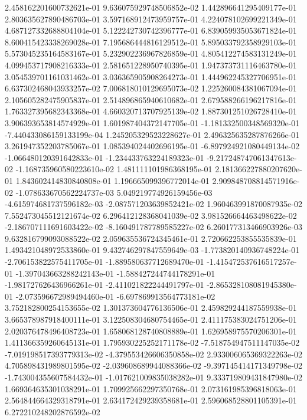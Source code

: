 2.458162201600732621e-01
9.636075929748506852e-02
1.442896641295409177e-01
2.803635627890486703e-01
3.597168912473959757e-01
4.224078102699221349e-01
4.687127332688804104e-01
5.122242730742396777e-01
6.839059935053671824e-01
8.600415423338269028e-01
7.195686444816129512e-01
5.895033792358929103e-01
5.573045235164583167e-01
5.232902236967826859e-01
4.805412274583131249e-01
4.099453717908216333e-01
2.581651228950740395e-01
1.947373731116463780e-01
3.054539701161031462e-01
3.036365905908264273e-01
1.444962245327706951e-01
6.637302468043933257e-02
7.006818010129695073e-02
1.225260084381067094e-01
2.105605282475905837e-01
2.514896865940610682e-01
2.679588266196217816e-01
1.763327395682343368e-01
4.660320713707925139e-02
1.887301251026728410e-01
3.906393653814574929e-01
1.601987404372147705e-01
-1.181332500348569320e-01
-7.440433086159133199e-04
1.245205329523228627e-01
2.496325635287876266e-01
3.261947352203785067e-01
1.085394024402696195e-01
-6.897924921080449134e-02
-1.066480120391642833e-01
-1.234433763224189323e-01
-9.217248747061347613e-02
-1.168735960580223610e-02
1.481111101986368195e-01
2.181366227880207620e-01
1.843602414830840808e-01
1.196665099396772014e-01
2.909848708814571916e-02
-1.078633670562224737e-03
5.049219774926159456e-03
-4.615974681737596182e-03
-2.087571203639852421e-02
1.960463991870087935e-02
7.552473045512121674e-02
6.296412128368041039e-02
3.981526664463498622e-02
-2.186707111691603422e-02
-8.160491787789585227e-02
6.260177313466903926e-03
9.632816799093088522e-02
2.059635536724345461e-01
2.720662253855535839e-01
1.493421048972533860e-01
9.432746297847559649e-03
-1.773820140936748224e-01
-2.706153822575411705e-01
-1.889580637712689470e-01
-1.415472537616517257e-01
-1.397043663288242143e-01
-1.588427244744178291e-01
-1.981727626436966261e-01
-2.411021822244491797e-01
-2.865328108081945380e-01
-2.073596672989494460e-01
-6.697869913564773181e-02
3.752182800254153655e-02
1.301373604776136506e-01
2.459829244187559938e-01
3.665378987918400111e-01
3.122508304680754465e-01
2.411175383024751206e-01
2.020376478496408723e-01
1.658068128740808889e-01
1.626958975570206301e-01
1.411366359260645131e-01
1.795930225252171178e-02
-7.518754947511147035e-02
-7.019198517393779313e-02
-4.379553426606350858e-02
2.933006065369322263e-02
4.705898431989801595e-02
-2.039608689944088366e-02
-9.397145414171349798e-02
-1.743004355607584432e-01
-1.017621009835038282e-01
9.333719809431847980e-02
1.669364635301038291e-01
1.709925662297350768e-01
2.073161985396818063e-01
2.564844664329318791e-01
2.634172429239358681e-01
2.596068528801105391e-01
6.272210248202876592e-02
